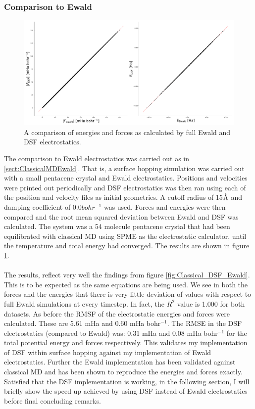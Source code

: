 \subsubsection{Comparison to Ewald}
\begin{figure}[htp]
  \includegraphics[width=\textwidth]{./img/ES/DSF_vs_Ewald_FSSH.png}
  \caption{\label{fig:DSF_vs_EwaldSH}A comparison of energies and forces as calculated by full Ewald and DSF electrostatics.}
\end{figure}
The comparison to Ewald electrostatics was carried out as in \ref{sect:ClassicalMDEwald}. That is, a surface hopping simulation was carried out with a small pentacene crystal and Ewald electrostatics. Positions and velocities were printed out periodically and DSF electrostatics was then ran using each of the position and velocity files as initial geometries. A cutoff radius of 15$\text{\normalfont\AA}$ and damping coefficient of 0.0$bohr^{-1}$ was used. Forces and energies were then compared and the root mean squared deviation between Ewald and DSF was calculated. The system was a 54 molecule pentacene crystal that had been equilibrated with classical MD using SPME as the electrostatic calculator, until the temperature and total energy had converged. The results are shown in figure \ref{fig:DSF_vs_EwaldSH}. 
\\\\
The results, reflect very well the findings from figure \ref{fig:Classical_DSF_Ewald}. This is to be expected as the same equations are being used. We see in both the forces and the energies that there is very little deviation of values with respect to full Ewald simulations at every timestep. In fact, the $R^2$ value is 1.000 for both datasets. As before the RMSF of the electrostatic energies and forces were calculated. These are 5.61 mHa and 0.60 mHa bohr$^{-1}$. The RMSE in the DSF electrostatics (compared to Ewald) was: 0.31 mHa and 0.08 mHa bohr$^{-1}$ for the total potential energy and forces respectively. This validates my implementation of DSF within surface hopping against my implementation of Ewald electrostatics. Further the Ewald implementation has been validated against classical MD and has been shown to reproduce the energies and forces exactly. Satisfied that the DSF implementation is working, in the following section, I will briefly show the speed up achieved by using DSF instead of Ewald electrostatics before final concluding remarks.

